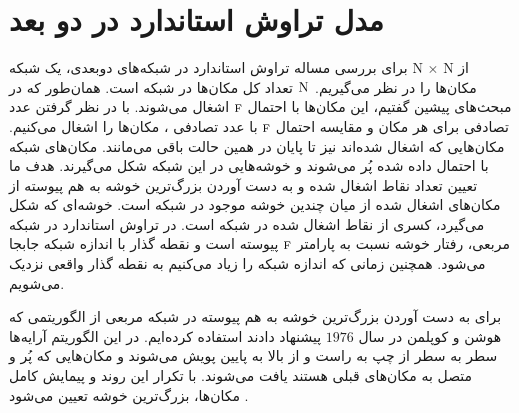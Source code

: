 
\section{مدل تراوش استاندارد در دو بعد}


{برای بررسی مساله تراوش استاندارد در شبکه‌های دوبعدی، یک شبکه \textsc{N } $\times$ \textsc{N} از مکان‌ها را در نظر می‌گیریم.
 $\textsc{N}$ 
 تعداد کل مکان‌ها در شبکه است. همان‌طور که در مبحث‌های پیشین گفتیم، این مکان‌ها با احتمال $\textsc{f}$ اشغال می‌شوند. با در نظر گرفتن عدد تصادفی برای هر مکان و  مقایسه احتمال $\textsc{f}$ با عدد تصادفی ، مکان‌ها را اشغال می‌کنیم. مکان‌هایی که اشغال شده‌اند  نیز تا پایان در همین حالت باقی می‌مانند. مکان‌های شبکه با احتمال داده شده پُر می‌شوند و خوشه‌هایی در این شبکه شکل می‌گیرند. هدف  ما تعیین تعداد نقاط اشغال شده و به دست آوردن بزرگ‌ترین خوشه به هم پیوسته از مکان‌های اشغال شده از میان چندین خوشه موجود در شبکه است. خوشه‌ای که شکل می‌گیرد، کسری از نقاط اشغال شده در شبکه است. در تراوش استاندارد  در شبکه‌ مربعی، رفتار خوشه نسبت به پارامتر $\textsc{f}$  پیوسته است و  نقطه گذار با اندازه شبکه جابجا می‌شود.  همچنین زمانی که اندازه شبکه را زیاد می‌کنیم به نقطه گذار واقعی نزدیک‌ می‌شویم.
 
 برای به دست آوردن بزرگ‌ترین خوشه به هم پیوسته  در شبکه مربعی از الگوریتمی که هوشن و کوپلمن در سال $1976$ پیشنهاد دادند  استفاده  کرده‌ایم. در این الگوریتم آرایه‌ها سطر به سطر از چپ به راست و از بالا به پایین پویش می‌شوند و مکان‌هایی که پُر و متصل به مکان‌های قبلی هستند یافت می‌شوند. با تکرار این روند و پیمایش کامل مکان‌ها، بزرگ‌ترین خوشه تعیین می‌شود \cite{baba}.  }

